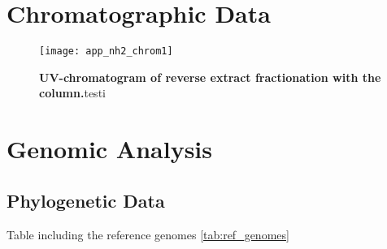 
\section{Chromatographic Data}
\label{sec:chromatographic_data}

\begin{figure}[htbp]
	\texttt{[image: app\_nh2\_chrom1]}
	\caption[UV-chromatogram of reverse extract fractionation with the \luna column.]{\textbf{UV-chromatogram of reverse extract fractionation with the \luna column.}testi}
	\label{fig:app_nh2_chrom1}
\end{figure}

\section{Genomic Analysis} %
\label{sec:genomic_analysis}

\subsection{Phylogenetic Data}

Table including the reference genomes \ref{tab:ref_genomes}

\newlength{\asdf} %

